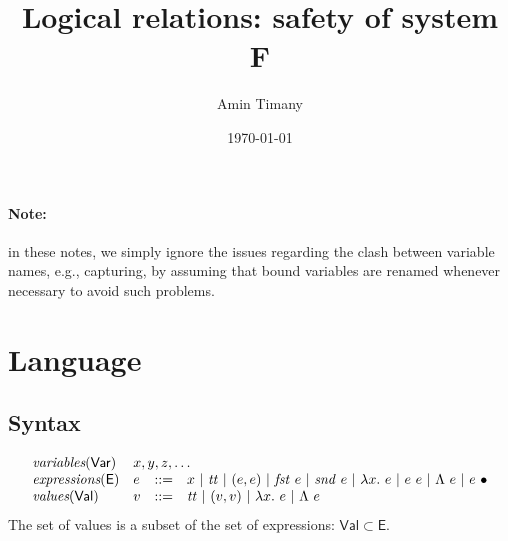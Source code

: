 \documentclass{article}
\title{Logical relations: safety of system F}
\author{Amin Timany}
\date{\today}
\newcommand{\gor}{~|~}
\newcommand{\fst}{\mathit{fst}}
\newcommand{\snd}{\mathit{snd}}
\newcommand{\TT}{\mathit{tt}}
\newcommand{\VAR}{\mathsf{Var}}
\newcommand{\EXP}{\mathsf{E}}
\newcommand{\VAL}{\mathsf{Val}}
\begin{document}
\maketitle

\paragraph{Note:} in these notes, we simply ignore the issues
regarding the clash between variable names, e.g., capturing, by
assuming that bound variables are renamed whenever necessary
to avoid such problems.

\section{Language}
\subsection{Syntax}
\[
\begin{array}{llll}
\textit{variables}(\VAR) & \multicolumn{3}{l}{x, y, z, \dots}\\
\textit{expressions}(\EXP) & e &::=& x \gor \TT \gor (e, e)
\gor \fst~e \gor \snd~e \gor \lambda x.~e \gor e~e
\gor \Lambda~e \gor e~\bullet\\
\textit{values}(\VAL) & v &::=& \TT \gor (v, v) \gor \lambda x.~e
\gor \Lambda~e
\end{array}
\]
The set of values is a subset of the set of expressions: $\VAL \subset \EXP$.
\end{document}
